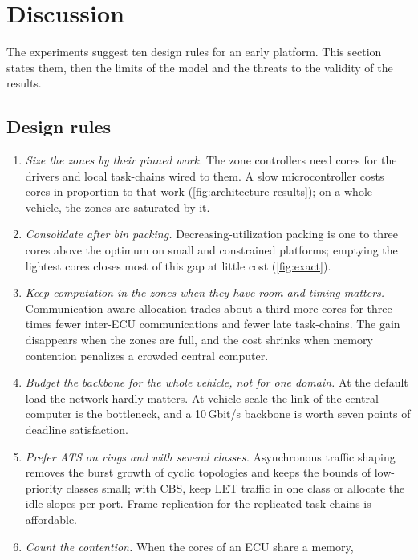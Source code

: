 \section{Discussion}
\label{sec:discussion}

\begin{inbrief}
The experiments suggest ten design rules for an early platform.
This section states them, then the limits of the model and the threats to
the validity of the results.
\end{inbrief}

\subsection{Design rules}

\begin{enumerate}[label=\textbf{R\arabic*.}, leftmargin=2em]
\item \emph{Size the zones by their pinned work.} The zone controllers need
cores for the drivers and local task-chains wired to them. A slow
microcontroller costs cores in proportion to that work
(\cref{fig:architecture-results}); on a whole vehicle, the zones are
saturated by it.
\item \emph{Consolidate after bin packing.} Decreasing-utilization packing
is one to three cores above the optimum on small and constrained
platforms; emptying the lightest cores closes most of this gap at little
cost (\cref{fig:exact}).
\item \emph{Keep computation in the zones when they have room and timing
matters.} Communication-aware allocation trades about a third more cores
for three times fewer inter-ECU communications and fewer late
task-chains. The gain disappears when the zones are full, and the cost
shrinks when memory contention penalizes a crowded central computer.
\item \emph{Budget the backbone for the whole vehicle, not for one domain.}
At the default load the network hardly matters. At vehicle scale the link
of the central computer is the bottleneck, and a 10\,Gbit/s backbone is
worth seven points of deadline satisfaction.
\item \emph{Prefer ATS on rings and with several classes.} Asynchronous
traffic shaping removes the burst growth of cyclic topologies and keeps
the bounds of low-priority classes small; with CBS, keep LET traffic in
one class or allocate the idle slopes per port. Frame replication for the
replicated task-chains is affordable.
\item \emph{Count the contention.} When the cores of an ECU share a memory,

\end{enumerate}
